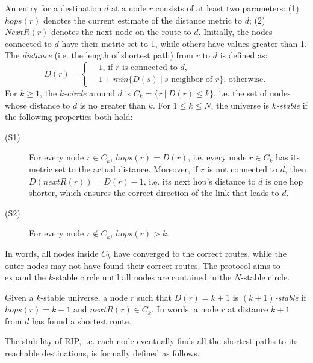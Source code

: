 \documentclass[a4paper,10pt,twocolumn]{article}
\begin{document}
An entry for a destination $d$ at a node $r$ consists of at least two parameters: (1) $hops(r)$ denotes the current estimate of the distance metric to $d$; (2) $NextR(r)$ denotes the next node on the route to $d$. Initially, the nodes connected to $d$ have their metric set to 1, while others have values greater than 1. The \emph{distance} (i.e. the length of shortest path) from $r$ to $d$ is defined as:
\begin{equation*}
D(r)= \left\{ \begin{aligned}
         &\text{$1$, if $r$ is connected to $d$,} \\
         &\text{$1+min\{D(s)~|~ s$ neighbor of $r\}$, otherwise.}
             \end{aligned} \right.
\end{equation*}
For $k \geq 1$, the \emph{$k$-circle} around $d$ is $C_k = \{r~|~D(r)\leq k\}$, i.e. the set of nodes whose distance to $d$ is no greater than $k$. For $1 \leq k \leq N$, the universe is \emph{$k$-stable} if the following properties both hold:
\begin{description}
  \item[(S1)] For every node $r \in C_k$, $hops(r)=D(r)$, i.e. every node $r \in C_k$ has its metric set to the actual distance. Moreover, if $r$ is not connected to $d$, then $D(nextR(r))=D(r)-1$, i.e. its next hop's distance to $d$ is one hop shorter, which ensures the correct direction of the link that leads to $d$.
  \item[(S2)] For every node $r \not\in C_k$, $hops(r)>k$.
\end{description}
In words, all nodes inside $C_k$ have converged to the correct routes, while the outer nodes may not have found their correct routes. The protocol aims to expand the $k$-stable circle until all nodes are contained in the $N$-stable circle.

Given a $k$-stable universe, a node $r$ such that $D(r)=k+1$ is \emph{$(k+1)$-stable} if $hops(r)=k+1$ and $nextR(r) \in C_k$. In words, a node $r$ at distance $k+1$ from $d$ has found a shortest route.

The stability of RIP, i.e. each node eventually finds all the shortest paths to its reachable destinations, is formally defined as follows.
\end{document}
